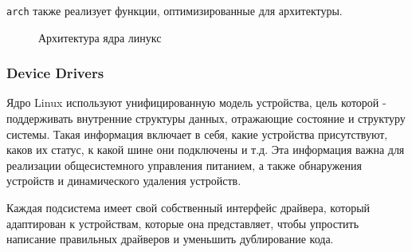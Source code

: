 \documentclass{article}
\begin{document}
    \texttt{arch} также реализует функции, оптимизированные для архитектуры.

    \newpage
    \begin{figure}[h!]
        \caption{Архитектура ядра линукс}
    \end{figure}

    \subsubsection{Device Drivers}
    Ядро Linux используют унифицированную модель устройства, цель которой -
    поддерживать внутренние структуры данных, отражающие состояние и
    структуру системы. Такая информация включает в себя, какие устройства
    присутствуют, каков их статус, к какой шине они подключены и т.д.
    Эта информация важна для реализации общесистемного управления питанием, а
    также обнаружения устройств и динамического удаления устройств.

    Каждая подсистема имеет свой собственный интерфейс драйвера, который
    адаптирован к устройствам, которые она представляет, чтобы упростить
    написание правильных драйверов и уменьшить дублирование кода.
\end{document}
